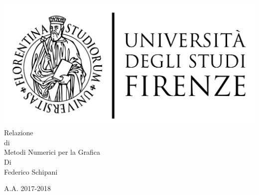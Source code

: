 \begin{titlepage}
	\begin{center}
 		\includegraphics[scale=0.30]{logo/LOGO}\\
				
		\vspace{1.0cm}
		\Huge  Relazione \\ \vspace{0.3cm} di\\ \vspace{0.3cm} Metodi Numerici per la Grafica \\
		\vspace{1.5 cm}
		\Large  Di \vspace{0.2cm} \\ Federico Schipani 

		 \vfill                   
      A.A. 2017-2018
      \vspace{1cm}

      \vfill   
	\end{center}
\end{titlepage}